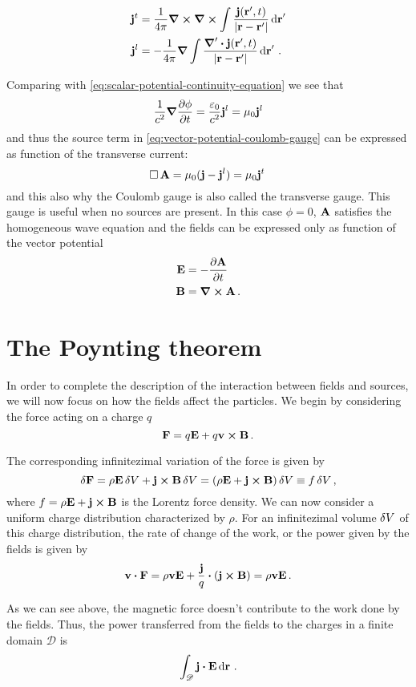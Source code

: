 \documentclass[12pt, class=report, crop=false]{standalone}
\begin{document}
\begin{align*}
  \vb{j}^t &= \frac{1}{4\pi} \curl \curl \int \frac{\vb{j}(\vb{r}',t)}{|\vb{r}-\vb{r}'|} \dd{\vb{r}}' \\
  \vb{j}^l &= -\frac{1}{4\pi} \grad \int
    \frac{\boldsymbol{\nabla}' \vdot \vb{j}(\vb{r}',t)}{|\vb{r}-\vb{r}'|} \dd{\vb{r}}'\,.
\end{align*}

Comparing with \cref{eq:scalar-potential-continuity-equation} we see that
\[
  \frac{1}{c^2} \grad{\pdv{\phi}{t}} = \frac{\varepsilon_0}{c^2} \vb{j}^l
  = \mu_0 \vb{j}^l
\]
and thus the source term in \cref{eq:vector-potential-coulomb-gauge} can
be expressed as function of the transverse current:
\[
  \operatorname{\Box} \vb{A} = \mu_0 (\vb{j} - \vb{j}^l) = \mu_0 \vb{j}^t\,
\]
and this also why the Coulomb gauge is also called the transverse gauge.
This gauge is useful when no sources are present. In this case \(\phi=0\),
\(\vb{A}\) satisfies the homogeneous wave equation and the fields can
be expressed only as function of the vector potential
\begin{align*}
  \vb{E} &= -\pdv{\vb{A}}{t} \\
  \vb{B} &= \curl{\vb{A}}\,.
\end{align*}

\section{The Poynting theorem}

In order to complete the description of the interaction between fields
and sources, we will now focus on how the fields affect the particles.
We begin by considering the force acting on a charge \(q\)
\[
  \vb{F} = q\vb{E} + q\vb{v} \cp \vb{B}\,.
\]

The corresponding infinitezimal variation of the force is given by
\[
  \var{\vb{F}} = \rho \vb{E} \var{V} + \vb{j} \cp \vb{B} \var{V}
    = (\rho \vb{E} + \vb{j} \cp \vb{B}) \var{V}
    \equiv f \var{V},
\]
where \(f = \rho \vb{E} + \vb{j} \cp \vb{B}\) is the Lorentz force
density. We can now consider a uniform charge distribution characterized
by \(\rho\). For an infinitezimal volume \(\var{V}\) of this charge distribution,
the rate of change of the work, or the power given by the
fields is given by
\[
  \vb{v} \vdot \vb{F} = \rho \vb{v} \vb{E} + \frac{\vb{j}}{q} \vdot (\vb{j} \cp \vb{B})
    = \rho \vb{v} \vb{E}\,.
\]

As we can see above, the magnetic force doesn't contribute to the work
done by the fields. Thus, the power transferred from the fields to the
charges in a finite domain \(\mathscr{D}\) is
\[
  \int_{\mathscr{D}} \vb{j} \vdot \vb{E} \dd{\vb{r}}\,.
\]
\end{document}
